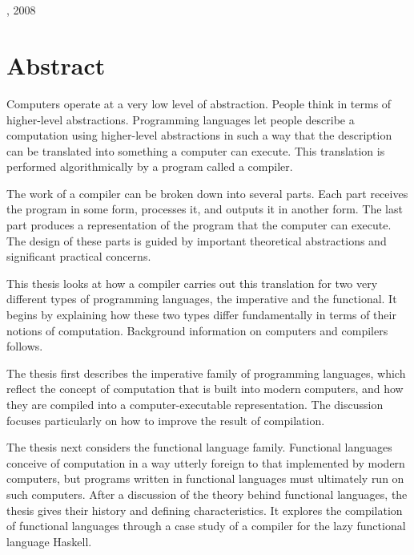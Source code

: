 \begingroup
\let\clearpage\relax
\let\cleardoublepage\relax
\let\cleardoublepage\relax

\begin{center}
    \myDisplayTitle \\ \medskip
  
    \myName \\
    \myUni, 2008
\end{center}

\chapter*{Abstract}
Computers operate at a very low level of abstraction. People think in terms of higher-level abstractions. Programming languages let people describe a computation using higher-level abstractions in such a way that the description can be translated into something a computer can execute. This translation is performed algorithmically by a program called a compiler.

The work of a compiler can be broken down into several parts. Each part receives the program in some form, processes it, and outputs it in another form. The last part produces a representation of the program that the computer can execute. The design of these parts is guided by important theoretical abstractions and significant practical concerns.

This thesis looks at how a compiler carries out this translation for two very different types of programming languages, the imperative and the functional. It begins by explaining how these two types differ fundamentally in terms of their notions of computation. Background information on computers and compilers follows.

The thesis first describes the imperative family of programming languages, which reflect the concept of computation that is built into modern computers, and how they are compiled into a computer-executable representation. The discussion focuses particularly on how to improve the result of compilation.

The thesis next considers the functional language family. Functional languages conceive of computation in a way utterly foreign to that implemented by modern computers, but programs written in functional languages must ultimately run on such computers. After a discussion of the theory behind functional languages, the thesis gives their history and defining characteristics. It explores the compilation of functional languages through a case study of a compiler for the lazy functional language Haskell.

